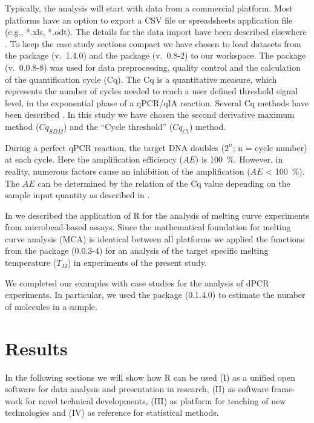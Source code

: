 Typically, the analysis will start with data from a commercial platform. 
Most platforms have an option to export a CSV file or spreadsheets application 
file (e.g., *.xls, *.odt). The details for the data import have been described 
elsewhere \citep{RDCT2010c, rodiger_rkward_2012}. To keep the case study 
sections compact we have chosen to load datasets from the  
package 
\citep{ritz_2008, spiess_2008} (v.~1.4.0) and the  package 
(v.~0.8-2) to our workspace. The  package 
\citep{roediger_2015_Bioinformatics} (v.~0.0.8-8) was used 
for data preprocessing, quality control and  the calculation of the 
quantification cycle (Cq). The Cq is a quantitative measure, which represents 
the number of cycles needed to reach a user defined threshold signal level, in 
the exponential phase of a qPCR/qIA reaction. Several Cq methods have been 
described \citep{ruijter_2013}. In this study we have chosen the second 
derivative maximum method ($Cq_{SDM}$) and the ``Cycle threshold'' ($Cq_{Ct}$) 
method.

During a perfect qPCR reaction, the target DNA doubles ($2^{n}$; n = cycle 
number) at each cycle. Here the amplification efficiency ($AE$) is 100~\%. 
However, in reality, numerous factors cause an inhibition of the amplification 
($AE$ < 100~\%). The $AE$ can be determined by the relation of the Cq value 
depending on the sample input quantity as described in 
\citep{roediger_2015_Bioinformatics, svec_2015}.

In \citet{roediger_RJ_2013} we described the application of R for the analysis 
of melting curve experiments from microbead-based assays. Since the 
mathematical 
foundation for melting curve analysis (MCA) is identical between all platforms 
we applied the functions from the  package (0.0.3-4) for an 
analysis of the target specific melting temperature ($T_{M}$) in experiments of 
the present study.

We completed our examples with case studies for the analysis of dPCR 
experiments. In particular, we used the  package (0.1.4.0) to 
estimate the number of molecules in a sample.

\section{Results}

In the following sections we will show how R can be used (I) as a unified open 
software for data analysis and presentation in research, 
(II) as software frame-work for novel technical developments, (III) as platform 
for teaching of new technologies and (IV) as reference for statistical methods.


